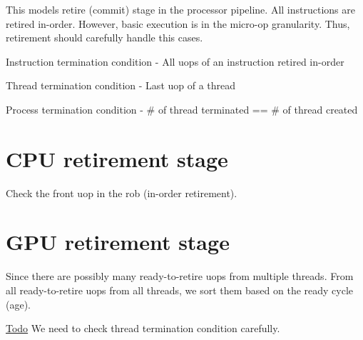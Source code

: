 This models retire (commit) stage in the processor pipeline. All instructions are retired in-\/order. However, basic execution is in the micro-\/op granularity. Thus, retirement should carefully handle this cases. \begin{DoxyItemize}
\item {\ttfamily Instruction termination condition} -\/ All uops of an instruction retired in-\/order \item {\ttfamily Thread termination condition} -\/ Last uop of a thread \item {\ttfamily Process termination condition} -\/ \# of thread terminated == \# of thread created\end{DoxyItemize}
\hypertarget{retire_retire_cpu}{}\section{CPU retirement stage}\label{retire_retire_cpu}
Check the front uop in the rob (in-\/order retirement).\hypertarget{retire_retire_gpu}{}\section{GPU retirement stage}\label{retire_retire_gpu}
Since there are possibly many ready-\/to-\/retire uops from multiple threads. From all ready-\/to-\/retire uops from all threads, we sort them based on the ready cycle (age).

\begin{Desc}
\item[\hyperlink{todo__todo000003}{Todo}]We need to check thread termination condition carefully. \end{Desc}

